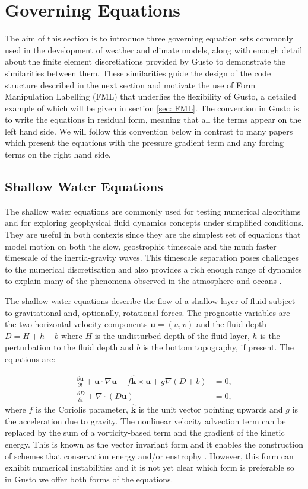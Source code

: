 \documentclass[11pt, a4paper]{article}
\def\MM#1{\boldsymbol{#1}}
\newcommand{\pp}[2]{\frac{\partial #1}{\partial #2}}
\begin{document}
\section{Governing Equations}
\label{sec: governing}
The aim of this section is to introduce three governing equation sets
commonly used in the development of weather and climate models, along
with enough detail about the finite element discretiations provided by
Gusto to demonstrate the similarities between them. These similarities
guide the design of the code structure described in the next section
and motivate the use of Form Manipulation Labelling (FML) that
underlies the flexibility of Gusto, a detailed example of which will
be given in section \ref{sec: FML}. The convention in Gusto is to
write the equations in residual form, meaning that all the terms
appear on the left hand side. We will follow this convention below in
contrast to many papers which present the equations with the pressure
gradient term and any forcing terms on the right hand side.

\subsection{Shallow Water Equations}
The shallow water equations are commonly used for testing numerical
algorithms and for exploring geophysical fluid dynamics concepts under
simplified conditions. They are useful in both contexts since they are
the simplest set of equations that model motion on both the slow,
geostrophic timescale and the much faster timescale of the
inertia-gravity waves. This timescale separation poses challenges to
the numerical discretisation and also provides a rich enough range of
dynamics to explain many of the phenomena observed in the atmosphere
and oceans \citep{zeitlin2018geophysical}.

The shallow water equations describe the flow of a shallow layer of
fluid subject to gravitational and, optionally, rotational forces. The
prognostic variables are the two horizontal velocity components
$\MM{u} = (u, v)$ and the fluid depth $D = H + h - b$ where $H$ is the
undisturbed depth of the fluid layer, $h$ is the perturbation to the
fluid depth and $b$ is the bottom topography, if present. The
equations are:

\begin{align}
  \pp{\MM{u}}{t} + \MM{u}\cdot\nabla\MM{u} + f\hat{\MM{k}}\times\MM{u} + g\nabla (D+b) &= 0, \\
  \pp{D}{t} + \nabla\cdot(D\MM{u}) &= 0,
\end{align}
where $f$ is the Coriolis parameter, $\hat{\MM{k}}$ is the unit vector
pointing upwards and $g$ is the acceleration due to gravity. The
nonlinear velocity advection term can be replaced by the sum of a
vorticity-based term and the gradient of the kinetic energy. This is
known as the vector invariant form and it enables the construction of
schemes that conservation energy and/or enstrophy
\citep{mcrae2014energy, bauer2018energy, wimmer2020energy,
  wimmer2021energy}. However, this form can exhibit numerical
instabilities \citep{bell2017numerical} and it is not yet clear which
form is preferable so in Gusto we offer both forms of the equations.
\end{document}
